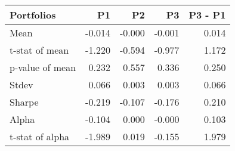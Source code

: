 \begin{tabular}{lrrrr}
\toprule
Portfolios & P1 & P2 & P3 & P3 - P1 \\
\midrule
Mean & -0.014 & -0.000 & -0.001 & 0.014 \\
t-stat of mean & -1.220 & -0.594 & -0.977 & 1.172 \\
p-value of mean & 0.232 & 0.557 & 0.336 & 0.250 \\
Stdev & 0.066 & 0.003 & 0.003 & 0.066 \\
Sharpe & -0.219 & -0.107 & -0.176 & 0.210 \\
Alpha & -0.104 & 0.000 & -0.000 & 0.103 \\
t-stat of alpha & -1.989 & 0.019 & -0.155 & 1.979 \\
\bottomrule
\end{tabular}
